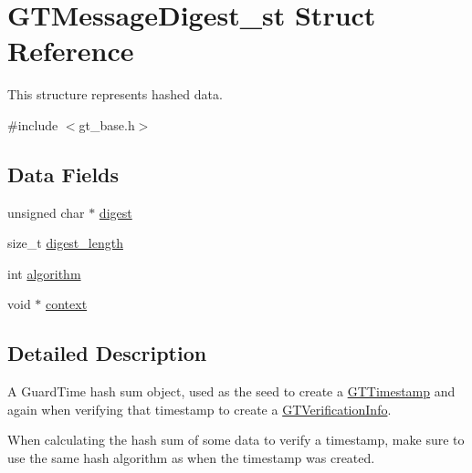 \hypertarget{struct_g_t_message_digest__st}{
\section{GTMessageDigest\_\-st Struct Reference}
\label{struct_g_t_message_digest__st}
}


This structure represents hashed data.  




{\ttfamily \#include $<$gt\_\-base.h$>$}

\subsection*{Data Fields}
\begin{DoxyCompactItemize}
\item 
unsigned char $\ast$ \hyperlink{struct_g_t_message_digest__st_a53a1fc3f2fdabc9de5b9b6655029513a}{digest}
\item 
size\_\-t \hyperlink{struct_g_t_message_digest__st_a82b4f7bd46c9de400747db1ad357ec80}{digest\_\-length}
\item 
int \hyperlink{struct_g_t_message_digest__st_a4562fac49b3cfdec37198dfa656158a5}{algorithm}
\item 
void $\ast$ \hyperlink{struct_g_t_message_digest__st_a1e0f499b53b27ef920b1bac9a1a83b3f}{context}
\end{DoxyCompactItemize}


\subsection{Detailed Description}
A GuardTime hash sum object, used as the seed to create a \hyperlink{group__timestamps_gaddb792efe52216386853c94e7aeaf6ba}{GTTimestamp} and again when verifying that timestamp to create a \hyperlink{group__verification_ga54ec3cb4a9e8bdfd7400116440e23b36}{GTVerificationInfo}.

When calculating the hash sum of some data to verify a timestamp, make sure to use the same hash algorithm as when the timestamp was created. 

